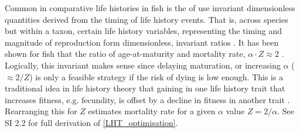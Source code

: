 \documentclass[a4paper]{article} %
\begin{document}
\begin{center}
\begin{minipage}{\linewidth}
Common in comparative life histories in fish is the of use invariant dimensionless quantities derived from the timing of life history events. That is, across species but within a taxon, certain life history variables, representing the timing and magnitude of reproduction form dimensionless, invariant ratios \autocite{Charnov1990-invariant, Charnov1993, Prince2015}. It has been shown for fish that the ratio of age-at-maturity and mortality rate, $\alpha\cdot Z \approx 2$ \autocite{Charnov1993}. Logically, this invariant makes sense since delaying maturation, or increasing $\alpha$ ($\approx 2/Z$) is only a feasible strategy if the risk of dying is low enough. This is a traditional idea in life history theory that gaining in one life history trait that increases fitness, e.g. fecundity, is offset by a decline in fitness in another trait \autocite{Charlesworth1980, stearns1992evolution, Roff2006}. Rearranging this for $Z$ estimates mortality rate for a given $\alpha$ value $Z = 2/\alpha$.
See SI 2.2 for full derivation of \cref{LHT_optimisation}.


\end{minipage}
\end{center}
\end{document}
